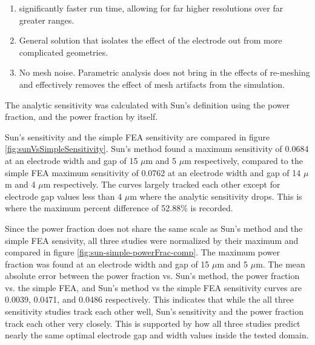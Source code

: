 \begin{enumerate}
	\item significantly faster run time, allowing for far higher resolutions over far greater ranges.
	\item General solution that isolates the effect of the electrode out from more complicated geometries.
	\item No mesh noise. Parametric analysis does not bring in the effects of re-meshing and effectively removes the effect of mesh artifacts from the simulation.
\end{enumerate}

\noindent The analytic sensitivity was calculated with Sun's definition using the power fraction, and the power fraction by itself. 

\par Sun's sensitivity and the simple FEA sensitivity are compared in figure \ref{fig:sunVsSimpleSensitivity}. Sun's method found a maximum sensitivity of 0.0684 at an electrode width and gap of 15 $\mu$m and 5 $\mu$m respectively, compared to the simple FEA maximum sensitivity of 0.0762 at an electrode width and gap of 14 $\mu$m and 4 $\mu$m respectively. The curves largely tracked each other except for electrode gap values less than 4 $\mu$m where the analytic sensitivity drops. This is where the maximum percent difference of 52.88\% is recorded. 
\par Since the power fraction does not share the same scale as Sun's method and the simple FEA sensivity, all three studies were normalized by their maximum and compared in figure \ref{fig:sun-simple-powerFrac-comp}. The maximum power fraction was found at an electrode width and gap of 15 $\mu$m and 5 $\mu$m. The mean absolute error between the power fraction vs. Sun's method, the power fraction vs. the simple FEA, and Sun's method vs the simple FEA sensitivity curves are 0.0039, 0.0471, and 0.0486 respectively. This indicates that while the all three sensitivity studies track each other well, Sun's sensitivity and the power fraction track each other very closely. This is supported by how all three studies predict nearly the same optimal electrode gap and width values inside the tested domain. 



